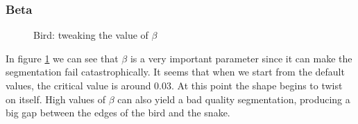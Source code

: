 \subsubsection{Beta}

\begin{figure}[!hbt]
\centering
{}

\caption{Bird: tweaking the value of $ \beta $}
\label{fig:ex2-beta-tweak}
\end{figure}

In figure \ref{fig:ex2-beta-tweak} we can see that $ \beta $ is a very important parameter since
it can make the segmentation fail catastrophically. It seems that when we start from the default
values, the critical value is around 0.03. At this point the shape begins to twist on itself. High
values of $\beta$ can also yield a bad quality segmentation, producing a big gap between the edges of
the bird and the snake.

